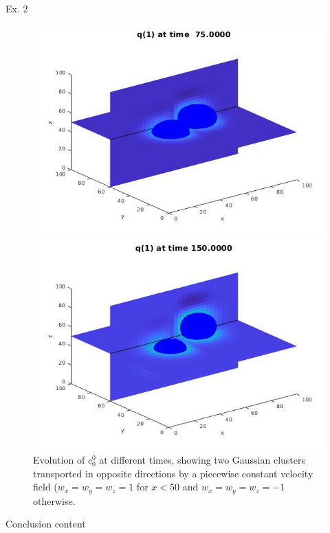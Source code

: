 \begin{frame}{Ex. 2}
\begin{figure}[H]
\begin{minipage}{0.4\textwidth}
    		\end{minipage}
    	\end{figure}
    	\begin{figure}[H]
    		\centering
    		\begin{minipage}{0.4\textwidth}
    			\includegraphics[scale=0.21]{Bilder_3D/2Glocken_wxi_wyj_wzi_2Cluster_t=75}
    		\end{minipage}
    		\hfill 
    		\begin{minipage}{0.4\textwidth}
    			\includegraphics[scale=0.21]{Bilder_3D/2Glocken_wxi_wyj_wzi_2Cluster_t=150}
    		\end{minipage}
    		\caption{Evolution of $c^0_0$ at different times, showing two Gaussian clusters transported in opposite directions by a piecewise constant velocity field ($w_x=w_y=w_z=1$ for $x<50$ and $w_x=w_y=w_z=-1$ otherwise.}
    	\end{figure}
    \end{frame}
    
    \begin{frame}{Conclusion}
 content
    \end{frame}


